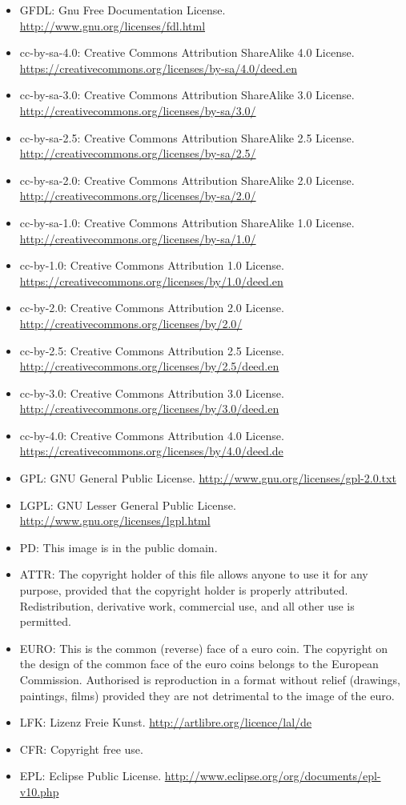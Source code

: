 \listoffigures
\label{ListOfFigures}
\begin{itemize}
\item GFDL: Gnu Free Documentation License. \url{http://www.gnu.org/licenses/fdl.html}
\item cc-by-sa-4.0:  Creative Commons Attribution ShareAlike 4.0 License. \url{https://creativecommons.org/licenses/by-sa/4.0/deed.en} 
\item cc-by-sa-3.0:  Creative Commons Attribution ShareAlike 3.0 License. \url{http://creativecommons.org/licenses/by-sa/3.0/} 
\item cc-by-sa-2.5:  Creative Commons Attribution ShareAlike 2.5 License. \url{http://creativecommons.org/licenses/by-sa/2.5/} 
\item cc-by-sa-2.0:  Creative Commons Attribution ShareAlike 2.0 License. \url{http://creativecommons.org/licenses/by-sa/2.0/} 
\item cc-by-sa-1.0:  Creative Commons Attribution ShareAlike 1.0 License. \url{http://creativecommons.org/licenses/by-sa/1.0/} 
\item cc-by-1.0:  Creative Commons Attribution 1.0 License. \url{https://creativecommons.org/licenses/by/1.0/deed.en} 
\item cc-by-2.0:  Creative Commons Attribution 2.0 License.  \url{http://creativecommons.org/licenses/by/2.0/}  
\item cc-by-2.5:  Creative Commons Attribution 2.5 License. \url{http://creativecommons.org/licenses/by/2.5/deed.en}  
\item cc-by-3.0:  Creative Commons Attribution 3.0 License. \url{http://creativecommons.org/licenses/by/3.0/deed.en}
\item cc-by-4.0:  Creative Commons Attribution 4.0 License. \url{https://creativecommons.org/licenses/by/4.0/deed.de} 
\item GPL:  GNU General Public License. \url{http://www.gnu.org/licenses/gpl-2.0.txt} 
\item LGPL:  GNU Lesser General Public License. \url{http://www.gnu.org/licenses/lgpl.html}
 \item PD: This image is in the public domain.
\item ATTR:  The copyright holder of this file allows anyone to use it for any purpose, provided that the copyright holder is properly attributed. Redistribution, derivative work, commercial use, and all other use is permitted. 
\item EURO: This is the common (reverse) face of a euro coin. The copyright on the design of the common face of the euro coins belongs to the European Commission. Authorised is reproduction in a format without relief (drawings, paintings, films) provided they are not detrimental to the image of the euro.
\item LFK: Lizenz Freie Kunst. \url{http://artlibre.org/licence/lal/de} 
\item CFR: Copyright free use. 
\item EPL: Eclipse Public License. \url{http://www.eclipse.org/org/documents/epl-v10.php} 
\end{itemize}
